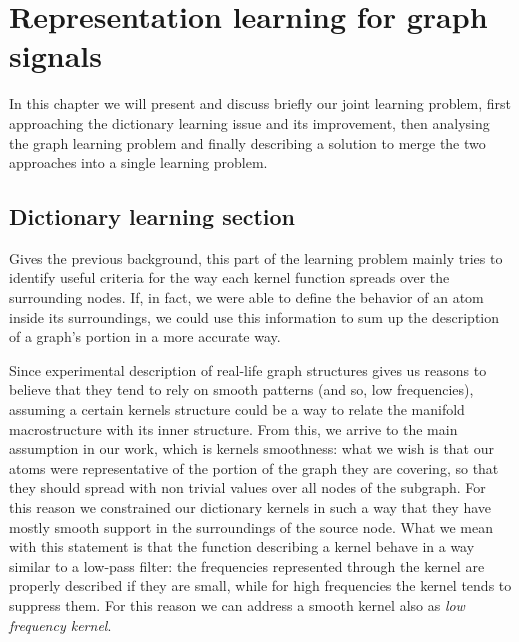 \chapter{Representation learning for graph signals}
In this chapter we will present and discuss briefly our joint learning problem, first approaching the dictionary learning issue and its improvement, then analysing the graph learning problem and finally describing a solution to merge the two approaches into a single learning problem.

\section{Dictionary learning section}
\label{sec:2implementations}
Gives the previous background, this part of the learning problem mainly tries to identify useful criteria for the way each kernel function spreads over the surrounding nodes. If, in fact, we were able to define the behavior of an atom inside its surroundings, we could use this information to sum up the description of a graph's portion in a more accurate way.

Since experimental description of real-life graph structures gives us reasons to believe that they tend to rely on smooth patterns (and so, low frequencies), assuming a certain kernels structure could be a way to relate the manifold macrostructure with its inner structure. From this, we arrive to the main assumption in our work, which is kernels smoothness: what we wish is that our atoms were representative of the portion of the graph they are covering, so that they should spread with non trivial values over all nodes of the subgraph. For this reason we constrained our dictionary kernels in such a way that they have mostly smooth support in the surroundings of the source node. What we mean with this statement is that the function describing a kernel behave in a way similar to a low-pass filter: the frequencies represented through the kernel are properly described if they are small, while for high frequencies the kernel tends to suppress them. For this reason we can address a smooth kernel also as \textit{low frequency kernel}.

